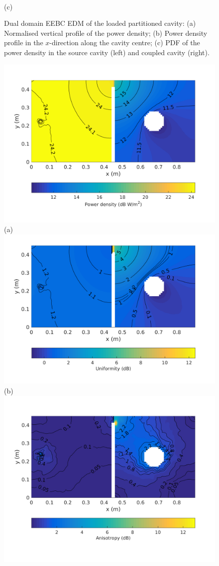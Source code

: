 \documentclass[a4paper]{article}
\numberwithin{equation}{section}
\begin{document}
\begin{figure}[ht]
\begin{center}
\\
{\footnotesize (c)}\\
\vspace{-2mm}
\caption{\label{fg:partcylsdm_profs} Dual domain EEBC EDM of the loaded partitioned cavity: (a) Normalised vertical profile of the power density; 
(b) Power density profile in the $x$-direction along the cavity centre; (c) PDF of the power density in the source cavity (left) and coupled cavity (right).}
\end{center}
\end{figure}

\begin{figure}[ht]
\begin{center}
\includegraphics[trim={0 13mm 0 12mm},clip,width=0.53\linewidth]{figures/DDM-EEBC_3D_DL_PowerDensityMap}\\
{\footnotesize (a)}\\
\vspace{2mm}
\includegraphics[trim={0 14mm 0 12mm},clip,width=0.53\linewidth]{figures/DDM-EEBC_3D_DL_EnergyDensityUniformityMap}\\
{\footnotesize (b)}\\
\vspace{2mm}
\includegraphics[trim={0 14mm 0 12mm},clip,width=0.53\linewidth]{figures/DDM-EEBC_3D_DL_EnergyDensityAnisotropyMap}\\

\end{center}
\end{figure}
\end{document}
